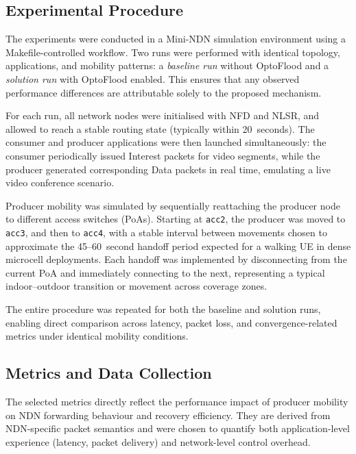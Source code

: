 \documentclass[conference]{IEEEtran}
\begin{document}
\subsection{Experimental Procedure}

The experiments were conducted in a Mini-NDN simulation environment using a Makefile-controlled workflow. Two runs were performed with identical topology, applications, and mobility patterns: a \textit{baseline run} without OptoFlood and a \textit{solution run} with OptoFlood enabled. This ensures that any observed performance differences are attributable solely to the proposed mechanism.

For each run, all network nodes were initialised with NFD and NLSR, and allowed to reach a stable routing state (typically within 20~seconds). The consumer and producer applications were then launched simultaneously: the consumer periodically issued Interest packets for video segments, while the producer generated corresponding Data packets in real time, emulating a live video conference scenario.

Producer mobility was simulated by sequentially reattaching the producer node to different access switches (PoAs). Starting at \texttt{acc2}, the producer was moved to \texttt{acc3}, and then to \texttt{acc4}, with a stable interval between movements chosen to approximate the 45--60~second handoff period expected for a walking UE in dense microcell deployments. Each handoff was implemented by disconnecting from the current PoA and immediately connecting to the next, representing a typical indoor–outdoor transition or movement across coverage zones.

The entire procedure was repeated for both the baseline and solution runs, enabling direct comparison across latency, packet loss, and convergence-related metrics under identical mobility conditions.

\subsection{Metrics and Data Collection}

The selected metrics directly reflect the performance impact of producer mobility on NDN forwarding behaviour and recovery efficiency. They are derived from NDN-specific packet semantics and were chosen to quantify both application-level experience (latency, packet delivery) and network-level control overhead.
\end{document}
